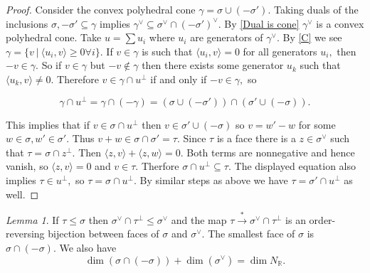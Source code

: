 \documentclass[BSc]{usydthesis}
\numberwithin{equation}{chapter}
\theoremstyle{remark}
\newtheorem{Lemma}[equation]{Lemma}
\newcommand{\R}{\mathbb{R}}
\newcommand{\V}{\vee}
\begin{document}
\begin{proof} Consider the convex polyhedral cone $\gamma = \sigma \cup (-\sigma').$ Taking duals of the inclusions $\sigma, -\sigma' \subseteq \gamma$ implies $\gamma^{\V} \subseteq \sigma^{\V} \cap (-\sigma')^{\V}.$ By \ref{Dual is cone} $\gamma^{\V}$ is a convex polyhedral cone. Take $u= \sum u_i$ where $u_i$ are generators of $\gamma^{\V}.$ By \ref{C} we see $\gamma = \{ v \ | \ \langle u_i, v \rangle \geq 0 \forall i \}.$ If $v\in \gamma$ is such that $\langle u_i, v\rangle =0$ for all generators $u_i,$ then $-v\in \gamma.$ So if $v\in \gamma$ but $-v\notin \gamma$ then there exists some generator $u_k$ such that $\langle u_k, v \rangle \neq 0.$ Therefore $v\in \gamma \cap u^{\perp} $ if and only if $-v\in \gamma,$ so

$$ \gamma \cap u^{\perp} = \gamma \cap (-\gamma) = (\sigma \cup (-\sigma') ) \cap ( \sigma' \cup (-\sigma) ).$$

This implies that if $v\in \sigma \cap u^{\perp}$ then $v\in \sigma' \cup (-\sigma)$ so $v= w'-w$ for some $w\in \sigma, w'\in \sigma'.$ Thus $v+w \in \sigma\cap \sigma' = \tau.$ Since $\tau$ is a face there is a $z\in \sigma^{\V}$ such that $\tau = \sigma \cap z^{\perp}.$ Then $\langle z, v \rangle + \langle z, w\rangle =0.$ Both terms are nonnegative and hence vanish, so $\langle z, v\rangle =0$ and $v\in \tau.$ Therfore $\sigma \cap u^{\perp} \subseteq \tau.$ The displayed equation also implies $\tau \in u^{\perp},$ so $\tau = \sigma \cap u^{\perp}.$ By similar steps as above we have $\tau = \sigma' \cap u^{\perp}$ as well. 
\end{proof}

\begin{Lemma}\label{DualFaces}
If $\tau \leq \sigma$ then $ \sigma^{\V}\cap \tau^{\perp} \leq \sigma^{\V}$ and the map $\tau \xrightarrow{*} \sigma^{\V}\cap \tau^{\perp}$ is an order-reversing bijection between faces of $\sigma$ and $\sigma^{\V}.$ The smallest face of $\sigma$ is $\sigma\cap (-\sigma).$ We also have $$\dim (\sigma \cap (-\sigma)) + \dim (\sigma^{\V}) = \dim N_{\R}.$$
\end{Lemma}
\end{document}
